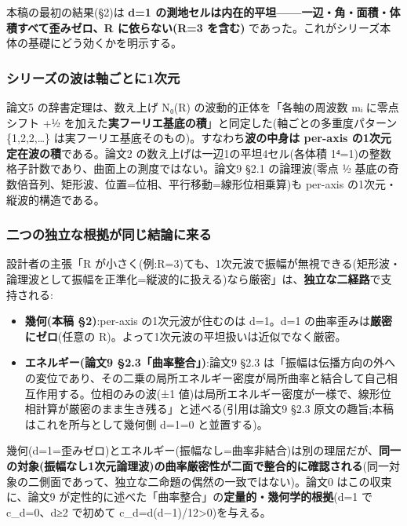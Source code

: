 \documentclass[
]{ltjsarticle}
\providecommand{\tightlist}{%
  \setlength{\itemsep}{0pt}\setlength{\parskip}{0pt}}
\begin{document}
本稿の最初の結果(§2)は \textbf{d=1
の測地セルは内在的平坦------一辺・角・面積・体積すべて歪みゼロ、R
に依らない(R=3 を含む)}
であった。これがシリーズ本体の基礎にどう効くかを明示する。

\subsubsection{シリーズの波は軸ごとに1次元}\label{ux30b7ux30eaux30fcux30baux306eux6ce2ux306fux8ef8ux3054ux3068ux306b1ux6b21ux5143}

論文5 の辞書定理は、数え上げ N₀(R) の波動的正体を「各軸の周波数 mᵢ
に零点シフト +½
を加えた\textbf{実フーリエ基底の積}」と同定した(軸ごとの多重度パターン
\{1,2,2,\ldots\} は実フーリエ基底そのもの)。すなわち\textbf{波の中身は
per-axis の1次元定在波の積}である。論文2
の数え上げは一辺1の平坦4セル(各体積
1⁴=1)の整数格子計数であり、曲面上の測度ではない。論文9 §2.1
の論理波(零点 ½
基底の奇数倍音列、矩形波、位置=位相、平行移動=線形位相乗算)も per-axis
の1次元・縦波的構造である。

\subsubsection{二つの独立な根拠が同じ結論に来る}\label{ux4e8cux3064ux306eux72ecux7acbux306aux6839ux62e0ux304cux540cux3058ux7d50ux8ad6ux306bux6765ux308b}

設計者の主張「R
が小さく(例:R=3)ても、1次元波で振幅が無視できる(矩形波・論理波として振幅を正準化=縦波的に扱える)なら厳密」は、\textbf{独立な二経路}で支持される:

\begin{itemize}
\tightlist
\item
  \textbf{幾何(本稿 §2)}:per-axis の1次元波が住むのは d=1。d=1
  の曲率歪みは\textbf{厳密にゼロ}(任意の
  R)。よって1次元波の平坦扱いは近似でなく厳密。
\item
  \textbf{エネルギー(論文9 §2.3「曲率整合」)}:論文9 §2.3
  は「振幅は伝播方向の外への変位であり、その二乗の局所エネルギー密度が局所曲率と結合して自己相互作用する。位相のみの波(±1
  値)は局所エネルギー密度が一様で、線形位相計算が厳密のまま生き残る」と述べる(引用は論文9
  §2.3 原文の趣旨;本稿はこれを所与として幾何側 d=1=0 と並置する)。
\end{itemize}

幾何(d=1=歪みゼロ)とエネルギー(振幅なし=曲率非結合)は別の理屈だが、\textbf{同一の対象(振幅なし1次元論理波)の曲率厳密性が二面で整合的に確認される}(同一対象の二側面であって、独立な二命題の偶然の一致ではない)。論文0
はこの収束に、論文9
が定性的に述べた「曲率整合」の\textbf{定量的・幾何学的根拠}(d=1 で
c\_d=0、d≥2 で初めて c\_d=d(d−1)/12\textgreater0)を与える。
\end{document}
